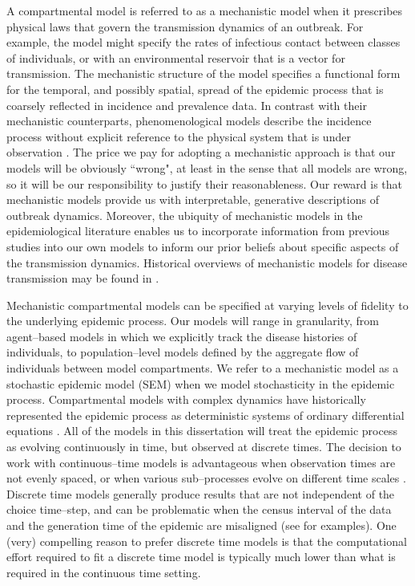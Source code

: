 A compartmental model is referred to as a mechanistic model when it prescribes physical laws that govern the transmission dynamics of an outbreak. For example, the model might specify the rates of infectious contact between classes of individuals, or with an environmental reservoir that is a vector for transmission. The mechanistic structure of the model specifies a functional form for the temporal, and possibly spatial, spread of the epidemic process that is coarsely reflected in incidence and prevalence data. In contrast with their mechanistic counterparts, phenomenological models describe the incidence process without explicit reference to the physical system that is under observation \cite{chowell2016review,chowell2017fitting}. The price we pay for adopting a mechanistic approach is that our models will be obviously ``wrong", at least in the sense that all models are wrong, so it will be our responsibility to justify their reasonableness. Our reward is that mechanistic models provide us with interpretable, generative descriptions of outbreak dynamics. Moreover, the ubiquity of mechanistic models in the epidemiological literature enables us to incorporate information from previous studies into our own models to inform our prior beliefs about specific aspects of the transmission dynamics. Historical overviews of mechanistic models for disease transmission may be found in \cite{anderson1992infectious,brauer2017mathematical,keeling2008,lessler2016mechanistic}.

Mechanistic compartmental models can be specified at varying levels of fidelity to the underlying epidemic process. Our models will range in granularity, from agent--based models in which we explicitly track the disease histories of individuals, to population--level models defined by the aggregate flow of individuals between model compartments. We refer to a mechanistic model as a stochastic epidemic model (SEM) when we model stochasticity in the epidemic process. Compartmental models with complex dynamics have historically represented the epidemic process as deterministic systems of ordinary differential equations \cite{keeling2008}. All of the models in this dissertation will treat the epidemic process as evolving continuously in time, but observed at discrete times. The decision to work with continuous--time models is advantageous when observation times are not evenly spaced, or when various sub--processes evolve on different time scales \cite{glass2003,shelton2014}. Discrete time models generally produce results that are not independent of the choice time--step, and can be problematic when the census interval of the data and the generation time of the epidemic are misaligned (see \cite{shelton2014} for examples). One (very) compelling reason to prefer discrete time models is that the computational effort required to fit a discrete time model is typically much lower than what is required in the continuous time setting. 

